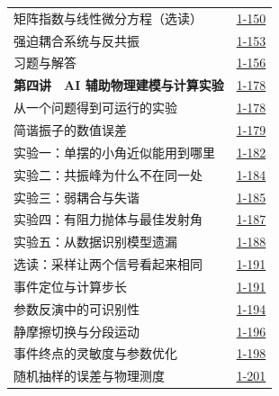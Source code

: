 \begin{longtable}{@{}p{}r@{}}
\hspace{1em}矩阵指数与线性微分方程（选读）&\href{course-page:1:155}{1-150}\\[2pt]
\hspace{1em}强迫耦合系统与反共振&\href{course-page:1:158}{1-153}\\[2pt]
\hspace{1em}习题与解答&\href{course-page:1:161}{1-156}\\[2pt]
\textbf{第四讲　AI 辅助物理建模与计算实验}&\href{course-page:1:183}{1-178}\\[2pt]
\hspace{1em}从一个问题得到可运行的实验&\href{course-page:1:183}{1-178}\\[2pt]
\hspace{1em}简谐振子的数值误差&\href{course-page:1:184}{1-179}\\[2pt]
\hspace{1em}实验一：单摆的小角近似能用到哪里&\href{course-page:1:187}{1-182}\\[2pt]
\hspace{1em}实验二：共振峰为什么不在同一处&\href{course-page:1:189}{1-184}\\[2pt]
\hspace{1em}实验三：弱耦合与失谐&\href{course-page:1:190}{1-185}\\[2pt]
\hspace{1em}实验四：有阻力抛体与最佳发射角&\href{course-page:1:192}{1-187}\\[2pt]
\hspace{1em}实验五：从数据识别模型遗漏&\href{course-page:1:193}{1-188}\\[2pt]
\hspace{1em}选读：采样让两个信号看起来相同&\href{course-page:1:196}{1-191}\\[2pt]
\hspace{1em}事件定位与计算步长&\href{course-page:1:196}{1-191}\\[2pt]
\hspace{1em}参数反演中的可识别性&\href{course-page:1:199}{1-194}\\[2pt]
\hspace{1em}静摩擦切换与分段运动&\href{course-page:1:201}{1-196}\\[2pt]
\hspace{1em}事件终点的灵敏度与参数优化&\href{course-page:1:203}{1-198}\\[2pt]
\hspace{1em}随机抽样的误差与物理测度&\href{course-page:1:206}{1-201}\\[2pt]

\end{longtable}
